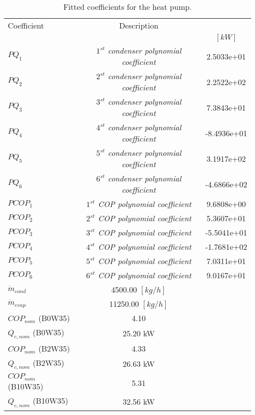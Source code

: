 \documentclass[english]{SPFShortReport}
\author{Dani Carbonell}
\begin{document}
\begin{table}[!ht]
\begin{small}
\caption{Fitted coefficients for the heat pump.}
\begin{center}
\resizebox{12cm}{!} 
{
\begin{tabular}{l | c c } 
\hline
\hline
Coefficient &Description & \\ 
 & &$[kW]$\\ 
\hline
$PQ_{1}$ & \emph{$1^{st}$ condenser polynomial coefficient}  & 2.5033e+01    \\ 
$PQ_{2}$ & \emph{$2^{st}$ condenser polynomial coefficient}  & 2.2522e+02    \\ 
$PQ_{3}$ & \emph{$3^{st}$ condenser polynomial coefficient}  & 7.3843e+01    \\ 
$PQ_{4}$ & \emph{$4^{st}$ condenser polynomial coefficient}  & -8.4936e+01    \\ 
$PQ_{5}$ & \emph{$5^{st}$ condenser polynomial coefficient}  & 3.1917e+02    \\ 
$PQ_{6}$ & \emph{$6^{st}$ condenser polynomial coefficient}  & -4.6866e+02    \\ 
\hline
$PCOP_{1}$ & \emph{$1^{st}$ COP polynomial coefficient}  & 9.6808e+00    \\ 
$PCOP_{2}$ & \emph{$2^{st}$ COP polynomial coefficient}  & 5.3607e+01    \\ 
$PCOP_{3}$ & \emph{$3^{st}$ COP polynomial coefficient}  & -5.5041e+01    \\ 
$PCOP_{4}$ & \emph{$4^{st}$ COP polynomial coefficient}  & -1.7681e+02    \\ 
$PCOP_{5}$ & \emph{$5^{st}$ COP polynomial coefficient}  & 7.0311e+01    \\ 
$PCOP_{6}$ & \emph{$6^{st}$ COP polynomial coefficient}  & 9.0167e+01    \\ 
\hline
$\dot m_{cond}$ & 4500.00 $[kg/h]$\\ 
$\dot m_{evap}$ & 11250.00 $[kg/h]$\\ 
\hline
$COP_{nom}$ (B0W35)& 4.10 \\ 
$Q_{c,nom}$ (B0W35)& 25.20 kW\\ 
$COP_{nom}$ (B2W35)& 4.33 \\ 
$Q_{c,nom}$ (B2W35)& 26.63 kW\\ 
$COP_{nom}$ (B10W35)& 5.31 \\ 
$Q_{c,nom}$ (B10W35)& 32.56 kW\\ 
\hline
\hline
\end{tabular}
}
\label{CoefTable}
\end{center}
\end{small}
\end{table}
\end{document}
